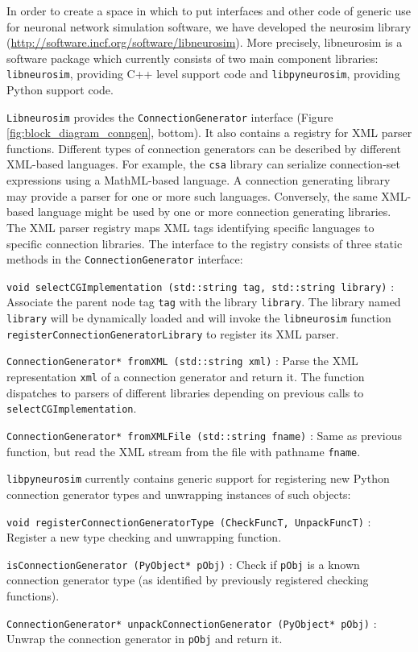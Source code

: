 \documentclass{frontiersSCNS} %
\begin{document}
In order to create a space in which to put interfaces and other code
of generic use for neuronal network simulation software, we have
developed the neurosim library
(\url{http://software.incf.org/software/libneurosim}).  More
precisely, libneurosim is a software package which currently consists
of two main component libraries: \verb|libneurosim|, providing C++
level support code and \verb|libpyneurosim|, providing Python support
code.

\verb|Libneurosim| provides the \verb|ConnectionGenerator| interface
(Figure \ref{fig:block_diagram_conngen}, bottom). It also contains a
registry for XML parser functions.  Different types of connection
generators can be described by different XML-based languages.  For
example, the \verb|csa| library can serialize connection-set
expressions using a MathML-based language.  A connection generating
library may provide a parser for one or more such languages.
Conversely, the same XML-based language might be used by one or more
connection generating libraries.  The XML parser registry maps XML
tags identifying specific languages to specific connection libraries.
The interface to the registry consists of three static methods in the
\verb|ConnectionGenerator| interface:

\begin{unlist}
\item[\tt void selectCGImplementation (std::string tag, std::string
  library)]:\\ Associate the parent node tag \verb|tag| with the library
  \verb|library|.  The library named \verb|library| will be
  dynamically loaded and will invoke the \verb|libneurosim| function
  \verb|registerConnectionGeneratorLibrary| to register its XML
  parser.
\item[\tt ConnectionGenerator* fromXML (std::string xml)]: Parse the
  XML representation \verb|xml| of a connection generator and return
  it. The function dispatches to parsers of different libraries
  depending on previous calls to \verb|selectCGImplementation|.
\item[\tt ConnectionGenerator* fromXMLFile (std::string fname)]: Same
  as previous function, but read the XML stream from the file with
  pathname \verb|fname|.
\end{unlist}

\verb|libpyneurosim| currently contains generic support for
registering new Python connection generator types and unwrapping
instances of such objects:

\begin{unlist}
\item[\tt void registerConnectionGeneratorType (CheckFuncT,
  UnpackFuncT)]: Register a new type checking and unwrapping
  function.
\item[\tt isConnectionGenerator (PyObject* pObj)]: Check if
  \verb|pObj| is a known connection generator type (as identified by
  previously registered checking functions).
\item[\tt ConnectionGenerator* unpackConnectionGenerator (PyObject*
  pObj)]: Unwrap the connection generator in \verb|pObj| and return
  it.
\end{unlist}
\end{document}

